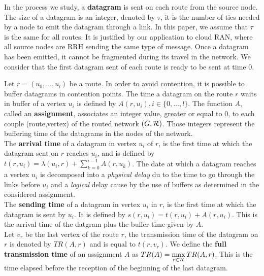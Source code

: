 \documentclass[english]{article}
\begin{document}
        In the process we study, a {\bf datagram} is sent on each route from the source node. The size of a datagram is an integer, denoted by $\tau$, it is the number of tics needed by a node to emit the datagram through a link.  In this paper, we assume that $\tau$ is the same for all routes. It is justified by our application to cloud RAN, where all source nodes are RRH sending the same type of message. Once a datagram has been emitted, it cannot be fragmented during its travel in the network. We consider that the first datagram sent of each route is ready to be sent at time $0$.

          Let $r=(u_0,\dots,u_l)$ be a route. In order to avoid contention, it is possible to buffer datagrams in contention points. The time a datagram on the route $r$ waits in buffer of a vertex $u_i$ is defined by $A(r,u_i), i \in \{0,\ldots,l\}$.
          The function $A$, called an \textbf{assignment}, associates an integer value, greater or equal to $0$, to each couple (route,vertex) of the routed network $(G,{\cal R})$. Those integers represent the buffering time of the datagrams in the nodes of the network. \\
       

 The \textbf{arrival time} of a datagram in vertex $u_i$ of $r$, is the first time at which the datagram sent on $r$ reaches $u_i$, and is defined by $t(r,u_i) = \lambda(u_i,r) + \sum_{k=0}^{i-1} A(r,u_k) $. The date at which a datagram reaches a vertex $u_i$ is decomposed into a \emph{physical delay} du to the time to go through the links before $u_i$ and a \emph{logical} delay cause by the use of buffers as determined in the considered assignment.\\
  The \textbf{sending time} of a datagram in vertex $u_i$ in $r$, is the first time at which the datagram is sent by $u_i$. It is defined by $s(r,u_i) = t(r,u_i) +  A(r,u_i) $. This is the arrival time of the datgram plus the buffer time given by $A$.\\
 
  Let $v_r$ be the last vertex of the route $r$, the transmission time of the datagram on 
  $r$ is denoted by $TR(A,r)$ and is equal to $t(r,v_r)$. We define the \textbf{full transmission time} of an assignment $A$ as $TR(A) = \displaystyle \max\limits_{r \in {\cal R}} TR(A,r) $. This is the time elapsed before the reception of the beginning of the last datagram. 
         
\end{document}
